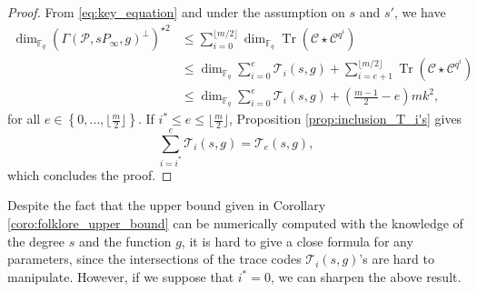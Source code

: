 \documentclass[a4paper]{amsart}
\newtheorem{coro}[thm]{Corollary}
\theoremstyle{definition}
\theoremstyle{remark}
\newcommand{\calP}{\mathcal{P}}
\newcommand{\calL}{\mathcal{L}}
\newcommand{\calC}{\mathcal{C}}
\newcommand{\calT}{\mathcal{T}}
\newcommand{\calX}{\mathcal{X}}
\newcommand{\fqm}{\mathbb{F}_{q^m}}
\newcommand{\fq}{\mathbb{F}_{q}}
\newcommand{\Tr}[1]{\operatorname{Tr}\left(#1\right)}
\newcommand{\set}[1]{\left\{#1\right\}}
\newcommand\mathieu[1]{\textcolor{brown}{#1}}
\begin{document}
%
\begin{proof}
From \eqref{eq:key_equation} and under the assumption on $s$ and $s'$, we have
        \begin{align*}
        \dim_{\fq}\left(\Gamma(\calP,sP_\infty,g)^{\perp}\right)^{\star 2}
        & \leq \sum\limits_{i=0}^{\lfloor m/2 \rfloor} \dim_{\fq} \Tr{\calC \star                     \calC^{q^i}} \\
        & \leq \dim_{\fq} \sum\limits_{i=0}^{e}\calT_i(s,g) + \sum\limits_{i=e+1}^{\lfloor m/2 \rfloor} \Tr{\calC \star \calC^{q^i}} \\
                & \leq \dim_{\fq} \sum\limits_{i=0}^{e}\calT_i(s,g) + \left( \frac{m-1}{2} -e \right)mk^2,
        \end{align*}
 for all $e \in \set{0,\dots,\lfloor \frac{m}{2} \rfloor}$. If $i^* \leq e \leq \lfloor \frac{m}{2} \rfloor$,  Proposition \ref{prop:inclusion_T_i's} gives
\[\sum\limits_{i=i^*}^e \calT_i(s,g) = \calT_e(s,g),\]
which concludes the proof.
\end{proof}

Despite the fact that the upper bound given in Corollary \ref{coro:folklore_upper_bound} can be numerically computed with the knowledge of the degree $s$ and the function $g$, it is hard to give a close formula for any parameters, since the intersections of the trace codes $\calT_i(s,g)$'s are hard to manipulate. However, if we suppose that $i^*=0$, we can sharpen the above result.
\end{document}
